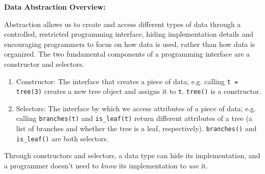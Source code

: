\textbf{Data Abstraction Overview:}

Abstraction allows us to create and access different types of data through a controlled, restricted programming interface, hiding implementation details and encouraging programmers to focus on how data is used, rather than how data is organized. The two fundamental components of a programming interface are a constructor and selectors.
\begin{enumerate}
	\item Constructor: The interface that creates a piece of data; e.g. calling \texttt{t = tree(3)} creates a new tree object and assigns it to \texttt{t}. \texttt{tree()} is a constructor.
	\item Selectors: The interface by which we access attributes of a piece of data; e.g. calling \texttt{branches(t)} and \texttt{is\_leaf(t)} return different attributes of a tree (a list of branches and whether the tree is a leaf, respectively). \texttt{branches()} and \texttt{is\_leaf()} are both selectors.
\end{enumerate}

Through constructors and selectors, a data type can hide its implementation, and a programmer doesn’t need to {\it know} its implementation to {\it use} it.
